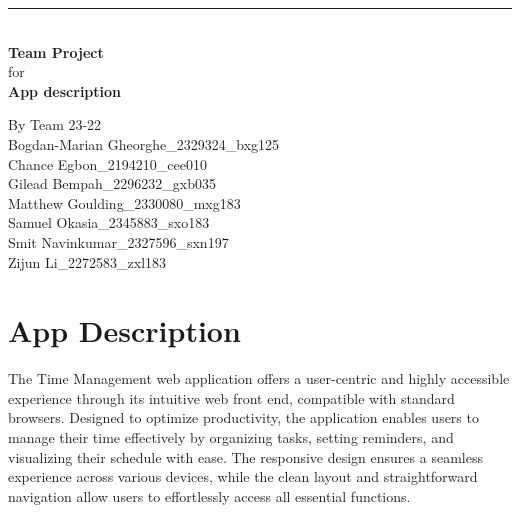 \documentclass[a4paper]{article}
\begin{document}

\begin{titlepage}
	
	\rule{\linewidth}{5pt}
	\raggedleft
	\fontsize{38pt}{50pt}\selectfont
    \textbf{\\Team Project\\}
    \fontsize{28pt}{60pt}\selectfont 
    for\\
    \fontsize{38pt}{60pt}\selectfont 
    \textbf{App description\\}
	
	\vfill %
	
	
	\parbox[t]{0.93\textwidth}{ %
		\raggedleft %
		\large %
		{\Large By Team 23-22}\\[4pt] %
		Bogdan-Marian Gheorghe\_2329324\_bxg125\\
		Chance Egbon\_2194210\_cee010\\
		Gilead Bempah\_2296232\_gxb035\\
		Matthew Goulding\_2330080\_mxg183\\
		Samuel Okasia\_2345883\_sxo183\\
		Smit Navinkumar\_2327596\_sxn197\\
		Zijun Li\_2272583\_zxl183\\
	}
	
\end{titlepage}

\section*{App Description}

The Time Management web application offers a user-centric and highly accessible experience through its intuitive web front end, compatible with standard browsers. Designed to optimize productivity, the application enables users to manage their time effectively by organizing tasks, setting reminders, and visualizing their schedule with ease. The responsive design ensures a seamless experience across various devices, while the clean layout and straightforward navigation allow users to effortlessly access all essential functions.
\end{document}

